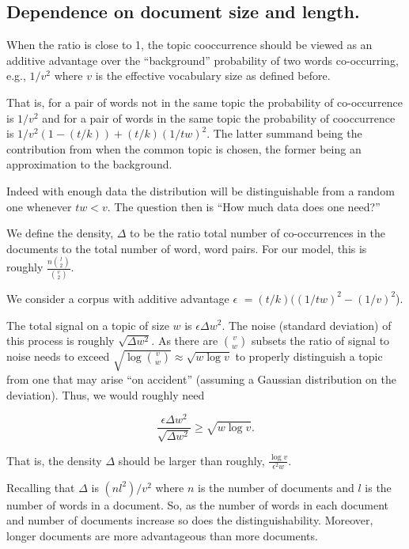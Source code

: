 \subsection{Dependence on document size and length.}

When the ratio is close to 1, the topic cooccurrence should be viewed
as an additive advantage over the ``background'' probability of two
words co-occurring, e.g., $1/v^2$ where $v$ is the effective vocabulary
size as defined before.

That is, for a pair of words not in the same topic the probability
of co-occurrence is $1/v^2$ and for a pair of words in the same topic
the probability of cooccurrence is $1/v^2 (1- (t/k)) + (t/k)(1/tw)^2$.
The latter summand being the contribution from when the common topic
is chosen, the former being an approximation to the background.


Indeed with enough data the distribution will be distinguishable from
a random one whenever $tw < v$.   The question then is ``How much
data does one need?''

We define the density, $\Delta$ to be the ratio total number of
co-occurrences in the documents to the total number of word, word
pairs.  For our model, this is roughly $\frac{n{l \choose 2}}{{v \choose 2}}$.

We consider a corpus with additive advantage $\epsilon$ $ = (t/k)
((1/tw)^2 - (1/v)^2$).

The total signal on a topic of size $w$ is $\epsilon \Delta w^2$. The
noise (standard deviation) of this process is roughly $\sqrt{\Delta
w^2}$.  As there are ${v \choose w}$ subsets the ratio of signal to
noise needs to exceed $\sqrt{\log {v \choose w}} \approx \sqrt{w \log
v}$ to properly distinguish a topic from one that may arise ``on
accident'' (assuming a Gaussian distribution on the deviation).  Thus,
we would roughly need

$$\frac{\epsilon \Delta w^2}{\sqrt{\Delta w^2}} \geq  \sqrt{w \log v}.$$

That is, the density $\Delta$ should be larger than roughly,
$\frac{\log v}{\epsilon^2 w}$.

Recalling that $\Delta$ is $(n l^2)/v^2$ where $n$ is the number of
documents and $l$ is the number of words in a document.  So, as the
number of words in each document and number of documents increase so
does the distinguishability.  Moreover, longer documents are more
advantageous than more documents.

